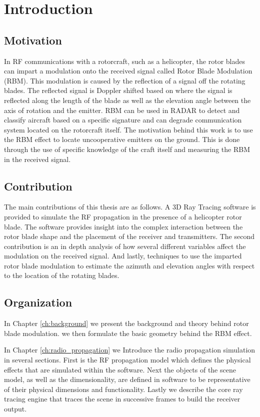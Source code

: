 \chapter{Introduction}

\section{Motivation}
In RF communications with a rotorcraft, such as a helicopter, the rotor blades can impart a modulation onto the received signal called Rotor Blade Modulation (RBM). This modulation is caused by the reflection of a signal off the rotating blades. The reflected signal is Doppler shifted based on where the signal is reflected along the length of the blade as well as the elevation angle between the axis of rotation and the emitter. RBM can be used in RADAR to detect and classify aircraft based on a specific signature and can degrade communication system located on the rotorcraft itself. The motivation behind this work is to use the RBM effect to locate uncooperative emitters on the ground. This is done through the use of specific knowledge of the craft itself and measuring the RBM in the received signal.

\section{Contribution}
The main contributions of this thesis are as follows. A 3D Ray Tracing software is provided to simulate the RF propagation in the presence of a helicopter rotor blade. The software provides insight into the complex interaction between the rotor blade shape and the placement of the receiver and transmitters. The second contribution is an in depth analysis of how several different variables affect the modulation on the received signal. And lastly, techniques to use the imparted rotor blade modulation to estimate the azimuth and elevation angles with respect to the location of the rotating blades.

\section{Organization}
In Chapter \ref{ch:background} we present the background and theory behind rotor blade modulation. we then formulate the basic geometry behind the RBM effect.

In Chapter \ref{ch:radio_propagation} we Introduce the radio propagation simulation in several sections. First is the RF propagation model which defines the physical effects that are simulated within the software. Next the objects of the scene model, as well as the dimensionality, are defined in software to be representative of their physical  dimensions and functionality. Lastly we describe the core ray tracing engine that traces the scene in successive frames to build the receiver output.


